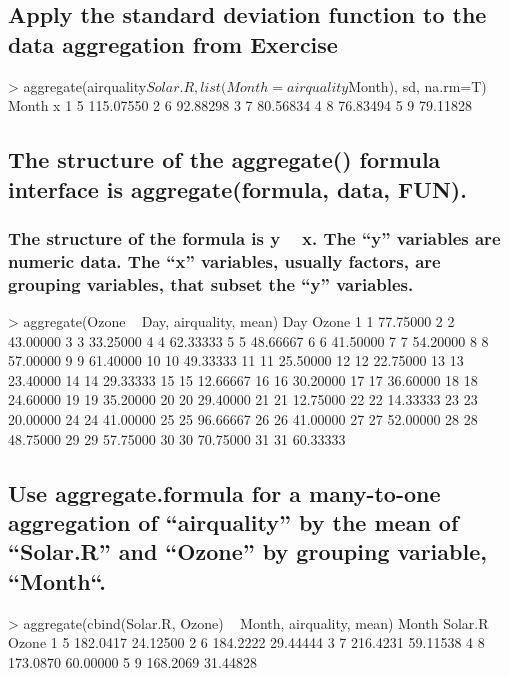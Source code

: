 \documentclass[a4paper,11pt]{article}
\begin{document}
\subsection{Apply the standard deviation function to the data aggregation from Exercise}
\begin{rcode}
> aggregate(airquality$Solar.R, list(Month=airquality$Month), sd, na.rm=T)
  Month         x
1     5 115.07550
2     6  92.88298
3     7  80.56834
4     8  76.83494
5     9  79.11828
\end{rcode}

\subsection{The structure of the aggregate() formula interface is aggregate(formula,
data, FUN).}
\subsubsection{The structure of the formula is y ~ x. The “y” variables are numeric data. The “x” variables, usually factors, are grouping variables, that subset the “y” variables.}
\begin{rcode}
> aggregate(Ozone ~ Day, airquality, mean)
   Day    Ozone
1    1 77.75000
2    2 43.00000
3    3 33.25000
4    4 62.33333
5    5 48.66667
6    6 41.50000
7    7 54.20000
8    8 57.00000
9    9 61.40000
10  10 49.33333
11  11 25.50000
12  12 22.75000
13  13 23.40000
14  14 29.33333
15  15 12.66667
16  16 30.20000
17  17 36.60000
18  18 24.60000
19  19 35.20000
20  20 29.40000
21  21 12.75000
22  22 14.33333
23  23 20.00000
24  24 41.00000
25  25 96.66667
26  26 41.00000
27  27 52.00000
28  28 48.75000
29  29 57.75000
30  30 70.75000
31  31 60.33333
\end{rcode}

\subsection{Use aggregate.formula for a many-to-one aggregation of “airquality” by the mean of “Solar.R” and “Ozone” by grouping variable, “Month“.}
\begin{rcode}
> aggregate(cbind(Solar.R, Ozone) ~ Month, airquality, mean)
  Month  Solar.R    Ozone
1     5 182.0417 24.12500
2     6 184.2222 29.44444
3     7 216.4231 59.11538
4     8 173.0870 60.00000
5     9 168.2069 31.44828
\end{rcode}
\end{document}

